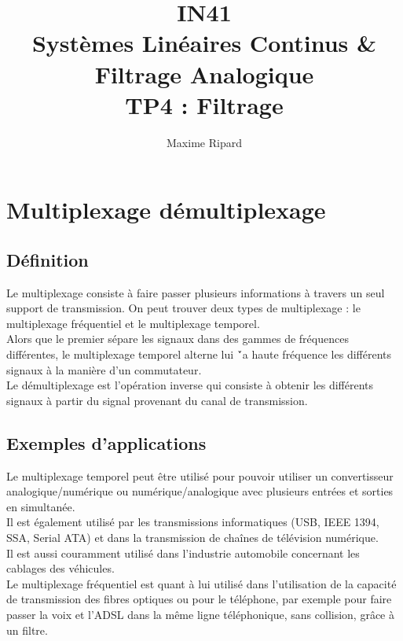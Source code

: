 \documentclass[a4paper, oneside]{report}
\title{IN41 \\Syst\`emes Lin\'eaires Continus \& Filtrage Analogique \\TP4 : Filtrage}
\author{Maxime Ripard}
\begin{document}
  \maketitle
  \newpage{}
  \tableofcontents
  \newpage{}

  \chapter{Multiplexage d\'emultiplexage}
    \section{D\'efinition}
 
Le multiplexage consiste \`a faire passer plusieurs informations \`a travers un seul support de transmission. On peut trouver deux types de multiplexage : le multiplexage fr\'equentiel et le multiplexage temporel.\\
Alors que le premier s\'epare les signaux dans des gammes de fr\'equences diff\'erentes, le multiplexage temporel alterne lui \'`a haute fr\'equence les diff\'erents signaux \`a la mani\`ere d'un commutateur.\\
Le d\'emultiplexage est l'op\'eration inverse qui consiste \`a obtenir les diff\'erents signaux \`a partir du signal provenant du canal de transmission.\\

    \section{Exemples d'applications}
  
  Le multiplexage temporel peut \^etre utilis\'e pour pouvoir utiliser un convertisseur analogique/num\'erique ou num\'erique/analogique avec plusieurs entr\'ees et sorties en simultan\'ee.\\
Il est \'egalement utilis\'e par les transmissions informatiques (USB, IEEE 1394, SSA, Serial ATA) et dans la transmission de cha\^ines de t\'el\'evision num\'erique.\\
Il est aussi couramment utilis\'e dans l'industrie automobile concernant les cablages des v\'ehicules. \\

Le multiplexage fr\'equentiel est quant \`a lui utilis\'e dans l'utilisation de la capacit\'e de transmission des fibres optiques ou pour le t\'el\'ephone, par exemple pour faire passer la voix et l'ADSL dans la m\^eme ligne t\'el\'ephonique, sans collision, gr\^ace \`a un filtre.
\end{document}
